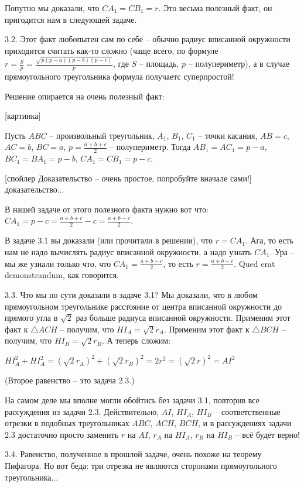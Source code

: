 Попутно мы доказали, что $CA_1 = CB_1 = r$. Это весьма полезный факт, он пригодится нам в следующей задаче.

3.2. Этот факт любопытен сам по себе -- обычно радиус вписанной окружности приходится считать как-то сложно (чаще всего, по формуле $r = \frac{S}{p} = \frac{\sqrt{p(p-a)(p-b)(p-c)}}{p}$, где $S$ -- площадь, $p$ -- полупериметр), а в случае прямоугольного треугольника формула получаетс суперпростой!

Решение опирается на очень полезный факт:

[картинка]

Пусть $ABC$ -- произвольный треугольник, $A_1$, $B_1$, $C_1$ -- точки касания, $AB = c$, $AC = b$, $BC = a$, $p = \frac{a+b+c}{2}$ -- полупериметр. Тогда $AB_1 = AC_1 = p - a$, $BC_1 = BA_1 = p - b$, $CA_1 = CB_1 = p - c$.

[спойлер Доказательство -- очень простое, попробуйте вначале сами!] доказательство...

В нашей задаче от этого полезного факта нужно вот что: $CA_1 = p - c = \frac{a+b+c}{2} - c = \frac{a + b - c}{2}$. 

В задаче 3.1 вы доказали (или прочитали в решении), что $r = CA_1$. Ага, то есть нам не надо вычислять радиус вписанной окружности, а надо узнать $CA_1$. Ура -- мы же узнали только что, что $CA_1 = \frac{a + b - c}{2}$, то есть $r = \frac{a + b - c}{2}$. Qued erat demonstrandum, как говорится.

3.3. Что мы по сути доказали в задаче 3.1? Мы доказали, что в любом прямоугольном треугольнике расстояние от центра вписанной окружности до прямого угла в $\sqrt{2}$ раз больше радиуса вписанной окружности. Применим этот факт к $\triangle ACH$ -- получим, что $HI_A = \sqrt{2} r_A$. Применим этот факт к $\triangle BCH$ -- получим, что $HI_B = \sqrt{2} r_B$. А теперь сложим: 

$HI_A^2 + HI_A^2 = (\sqrt{2} r_A)^2 + (\sqrt{2} r_B)^2 = 2r^2 = (\sqrt{2} r)^2 = AI^2$

(Второе равенство -- это задача 2.3.)

На самом деле мы вполне могли обойтись без задачи 3.1, повторив все рассуждения из задачи 2.3. Действительно, $AI$, $HI_A$, $HI_B$ -- соответственные отрезки в подобных треугольниках $ABC$, $ACH$, $BCH$, и в рассуждениях задачи 2.3 достаточно просто заменить $r$ на $AI$, $r_A$ на $HI_A$, $r_B$ на $HI_B$ -- всё будет верно!

3.4. Равенство, полученное в прошлой задаче, очень похоже на теорему Пифагора. Но вот беда: три отрезка не являются сторонами прямоугольного треугольника...

